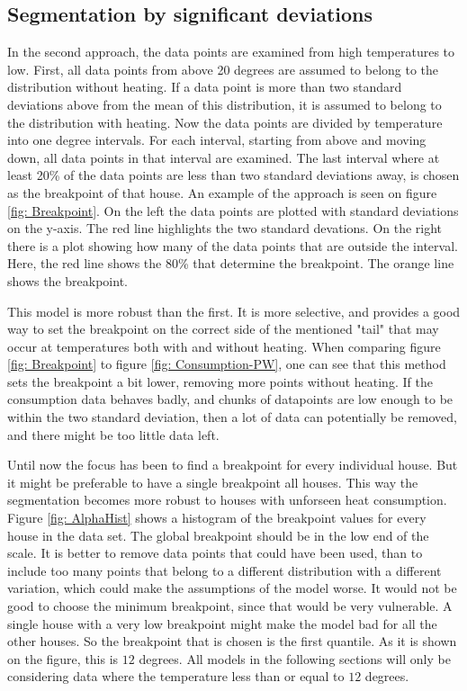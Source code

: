 \subsection{Segmentation by significant deviations}
In the second approach, the data points are examined from high temperatures to low. First, all data points from
above 20 degrees are assumed to belong to the distribution without heating. If a data point is more than two
standard deviations above from the mean of this distribution, it is assumed to belong to the distribution with
heating. Now the data points are divided by temperature into one degree intervals. For each interval, starting
from above and moving down, all data points in that interval are examined. The last interval where at least
20\% of the data points are less than two standard deviations away, is chosen as the breakpoint of that house.
An example of the approach is seen on figure \ref{fig: Breakpoint}. On the left the data points are plotted with
standard deviations on the y-axis. The red line highlights the two standard devations. On the right there is a plot
showing how many of the data points that are outside the interval. Here, the red line shows the 80\% that determine
the breakpoint. The orange line shows the breakpoint.

This model is more robust than the first. It is more selective, and provides a good way to set the
breakpoint on the correct side of the mentioned "tail" that may occur at temperatures both with and without heating.
When comparing figure \ref{fig: Breakpoint} to figure \ref{fig: Consumption-PW}, one can see that this method sets
the breakpoint a bit lower, removing more points without heating. If the consumption data behaves badly, and chunks
of datapoints are low enough to be within the two standard deviation, then a lot of data can potentially be removed,
and there might be too little data left.

Until now the focus has been to find a breakpoint for every individual house. But it might be preferable to have a
single breakpoint all houses. This way the segmentation becomes more robust to houses with unforseen heat consumption.
Figure \ref{fig: AlphaHist} shows a histogram of the breakpoint values for every house in the data set. The global
breakpoint should be in the low end of the scale. It is better to remove data points that could have been used, than
to include too many points that belong to a different distribution with a different variation, which could make the
assumptions of the model worse. It would not be good to choose the minimum breakpoint, since that would be very
vulnerable. A single house with a very low breakpoint might make the model bad for all the other houses. So the
breakpoint that is chosen is the first quantile. As it is shown on the figure, this is $12$ degrees. All models in
the following sections will only be considering data where the temperature less than or equal to $12$ degrees.

